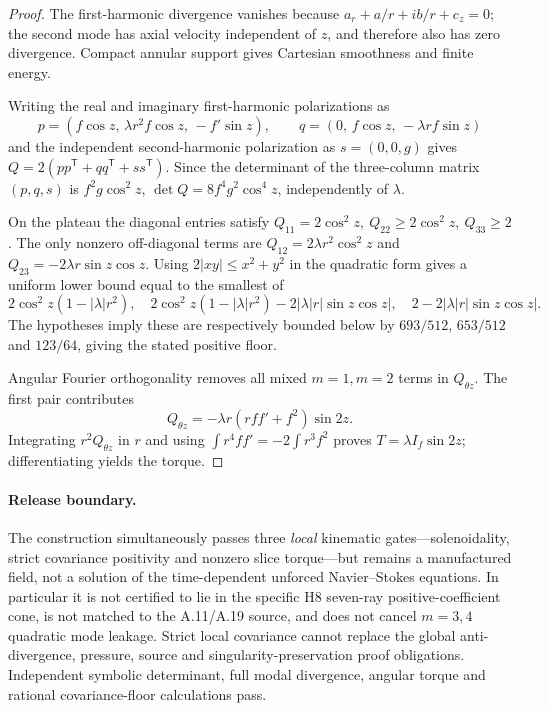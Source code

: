 \begin{proof}
The first-harmonic divergence vanishes because
$a_r+a/r+ib/r+c_z=0$; the second mode has axial
velocity independent of $z$, and therefore also has zero
divergence. Compact annular support gives Cartesian
smoothness and finite energy.

Writing the real and imaginary first-harmonic polarizations as
\[
p=(f\cos z,\,\lambda r^2 f\cos z,\,-f'\sin z),\qquad
q=(0,\,f\cos z,\,-\lambda r f\sin z)
\]
and the independent second-harmonic polarization as
$s=(0,0,g)$ gives $Q=2(pp^{\mathsf T}+qq^{\mathsf T}
+ss^{\mathsf T})$. Since the determinant of the
three-column matrix $(p,q,s)$ is $f^2g\cos^2z$,
$\det Q=8f^4g^2\cos^4z$, independently of $\lambda$.

On the plateau the diagonal entries satisfy
$Q_{11}=2\cos^2z,\ Q_{22}\ge2\cos^2z,\ Q_{33}\ge2$.
The only nonzero off-diagonal terms are
$Q_{12}=2\lambda r^2\cos^2z$ and
$Q_{23}=-2\lambda r\sin z\cos z$.
Using $2|xy|\le x^2+y^2$ in the quadratic form gives a
uniform lower bound equal to the smallest of
\[
2\cos^2z(1-|\lambda|r^2),\quad
2\cos^2z(1-|\lambda|r^2)-2|\lambda|r|\sin z\cos z|,
\quad
2-2|\lambda|r|\sin z\cos z|.
\]
The hypotheses imply these are respectively bounded below
by $693/512$, $653/512$ and $123/64$, giving the stated
positive floor.

Angular Fourier orthogonality removes all mixed $m=1,m=2$
terms in $Q_{\theta z}$. The first pair contributes
\[
Q_{\theta z}=-\lambda r(rff'+f^2)\sin 2z.
\]
Integrating $r^2Q_{\theta z}$ in $r$ and using
$\int r^4ff'=-2\int r^3f^2$ proves
$T=\lambda I_f\sin2z$; differentiating yields the torque.
\end{proof}

\paragraph{Release boundary.}
The construction simultaneously passes three \emph{local}
kinematic gates---solenoidality, strict covariance positivity
and nonzero slice torque---but remains a manufactured field,
not a solution of the time-dependent unforced Navier--Stokes
equations. In particular it is not certified to lie in the
specific H8 seven-ray positive-coefficient cone, is not matched
to the A.11/A.19 source, and does not cancel $m=3,4$
quadratic mode leakage. Strict local covariance cannot
replace the global anti-divergence, pressure, source and
singularity-preservation proof obligations.
Independent symbolic determinant, full modal divergence,
angular torque and rational covariance-floor calculations pass.
